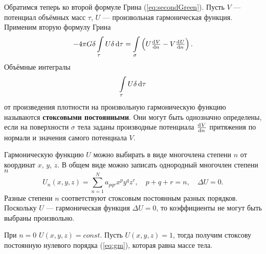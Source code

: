 \documentclass[11pt, a4paper]{article}
\theoremstyle{plain}
\theoremstyle{definition}
\theoremstyle{remark}
\begin{document}
Обратимся теперь ко второй формуле Грина (\ref{eq:secondGreen}). Пусть $V$ --- потенциал
объёмных масс $\tau$, $U$ --- произвольная гармоническая функция. Применим вторую формулу Грина
\begin{equation*}
    -4\pi G\delta \int\limits_{\tau} U \delta \dif\tau = \int\limits_\sigma 
    \left( U \od{V}{n} - V \od{U}{n} \right). 
\end{equation*}
Объёмные интегралы 
\begin{equation*}
\int\limits_{\tau} U \delta \dif\tau
\end{equation*}
от произведения плотности на произвольную гармоническую функцию называются
\textbf{стоксовыми постоянными}. Они могут быть однозначно определены, если на поверхности
$\sigma$ тела заданы производные потенциала $\od{V}{n}$ притяжения по нормали и значения самого потенциала $V$.

Гармоническую функцию $U$ можно выбирать в виде многочлена степени $n$ от координат $x$, $y$,
$z$. В общем виде можно записать однородный многочлен степени $n$
\begin{equation*}
    U_n \left( x, y, z \right) = \sum\limits_{n=1}^{N} a_{pqr} x^p y^q z^r,\quad p + q + r = n,
    \quad \Delta U = 0.
\end{equation*}
Разные степени $n$ соответствуют стоксовым постоянным разных порядков. Поскольку $U$ ---
гармоническая функция $\Delta U = 0$, то коэффициенты не могут быть выбраны произвольно.

При $n = 0$ $U\left( x, y, z \right) = const$. Пусть  $U \left( x, y, z \right) = 1$, тогда
получим стоксову постоянную нулевого порядка (\ref{eq:gm}), которая равна массе тела.
\end{document}

